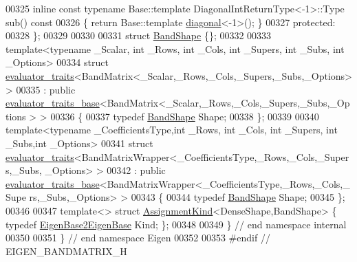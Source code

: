 \begin{DoxyCode}
00325     \textcolor{keyword}{inline} \textcolor{keyword}{const} \textcolor{keyword}{typename} Base::template DiagonalIntReturnType<-1>::Type sub()\textcolor{keyword}{ const}
00326 \textcolor{keyword}{    }\{ \textcolor{keywordflow}{return} Base::template \hyperlink{class_eigen_1_1internal_1_1_band_matrix_base_abce1c4d69e72ec594f67a841d1040606}{diagonal}<-1>(); \}
00327   \textcolor{keyword}{protected}:
00328 \};
00329 
00330 
00331 \textcolor{keyword}{struct }\hyperlink{struct_eigen_1_1internal_1_1_band_shape}{BandShape} \{\};
00332 
00333 \textcolor{keyword}{template}<\textcolor{keyword}{typename} \_Scalar, \textcolor{keywordtype}{int} \_Rows, \textcolor{keywordtype}{int} \_Cols, \textcolor{keywordtype}{int} \_Supers, \textcolor{keywordtype}{int} \_Subs, \textcolor{keywordtype}{int} \_Options>
00334 \textcolor{keyword}{struct }\hyperlink{struct_eigen_1_1internal_1_1evaluator__traits}{evaluator\_traits}<BandMatrix<\_Scalar,\_Rows,\_Cols,\_Supers,\_Subs,\_Options> >
00335   : \textcolor{keyword}{public} \hyperlink{struct_eigen_1_1internal_1_1evaluator__traits__base}{evaluator\_traits\_base}<BandMatrix<\_Scalar,\_Rows,\_Cols,\_Supers,\_Subs,\_Options
      > >
00336 \{
00337   \textcolor{keyword}{typedef} \hyperlink{struct_eigen_1_1internal_1_1_band_shape}{BandShape} Shape;
00338 \};
00339 
00340 \textcolor{keyword}{template}<\textcolor{keyword}{typename} \_CoefficientsType,\textcolor{keywordtype}{int} \_Rows, \textcolor{keywordtype}{int} \_Cols, \textcolor{keywordtype}{int} \_Supers, \textcolor{keywordtype}{int} \_Subs,\textcolor{keywordtype}{int} \_Options>
00341 \textcolor{keyword}{struct }\hyperlink{struct_eigen_1_1internal_1_1evaluator__traits}{evaluator\_traits}<BandMatrixWrapper<\_CoefficientsType,\_Rows,\_Cols,\_Supers,\_Subs,
      \_Options> >
00342   : \textcolor{keyword}{public} \hyperlink{struct_eigen_1_1internal_1_1evaluator__traits__base}{evaluator\_traits\_base}<BandMatrixWrapper<\_CoefficientsType,\_Rows,\_Cols,\_Supe
      rs,\_Subs,\_Options> >
00343 \{
00344   \textcolor{keyword}{typedef} \hyperlink{struct_eigen_1_1internal_1_1_band_shape}{BandShape} Shape;
00345 \};
00346 
00347 \textcolor{keyword}{template}<> \textcolor{keyword}{struct }\hyperlink{struct_eigen_1_1internal_1_1_assignment_kind}{AssignmentKind}<DenseShape,BandShape> \{ \textcolor{keyword}{typedef} 
      \hyperlink{struct_eigen_1_1internal_1_1_eigen_base2_eigen_base}{EigenBase2EigenBase} Kind; \};
00348 
00349 \} \textcolor{comment}{// end namespace internal}
00350 
00351 \} \textcolor{comment}{// end namespace Eigen}
00352 
00353 \textcolor{preprocessor}{#endif // EIGEN\_BANDMATRIX\_H}
\end{DoxyCode}
